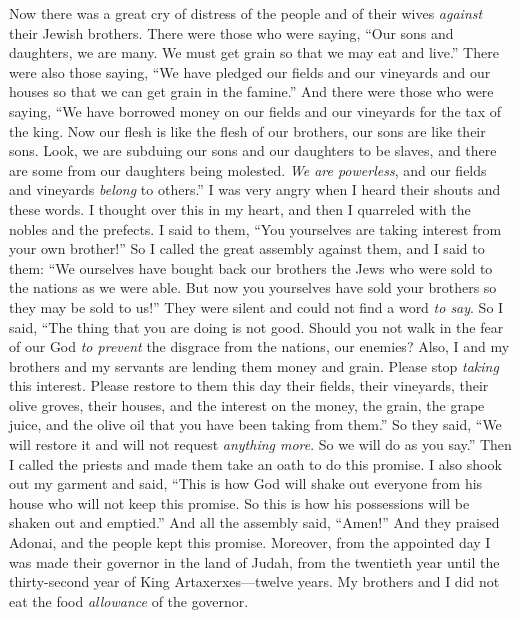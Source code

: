 \begin{biblechapter} %
 Now there was a great cry of distress of the people and of their wives \textit{against} their Jewish brothers.
\verse There were those who were saying, “Our sons and daughters, we are many. We must get grain so that we may eat and live.”
\verse There were also those saying, “We have pledged our fields and our vineyards and our houses so that we can get grain in the famine.”
\verse And there were those who were saying, “We have borrowed money on our fields and our vineyards for the tax of the king.
\verse Now our flesh is like the flesh of our brothers, our sons are like their sons. Look, we are subduing our sons and our daughters to be slaves, and there are some from our daughters being molested. \textit{We are powerless}, and our fields and vineyards \textit{belong} to others.”
\verse I was very angry when I heard their shouts and these words.
\verse I thought over this in my heart, and then I quarreled with the nobles and the prefects. I said to them, “You yourselves are taking interest from your own brother!” So I called the great assembly against them,
\verse and I said to them: “We ourselves have bought back our brothers the Jews who were sold to the nations as we were able. But now you yourselves have sold your brothers so they may be sold to us!” They were silent and could not find a word \textit{to say}.
\verse So I said, “The thing that you are doing is not good. Should you not walk in the fear of our God \textit{to prevent} the disgrace from the nations, our enemies?
\verse Also, I and my brothers and my servants are lending them money and grain. Please stop \textit{taking} this interest.
\verse Please restore to them this day their fields, their vineyards, their olive groves, their houses, and the interest on the money, the grain, the grape juice, and the olive oil that you have been taking from them.”
\verse So they said, “We will restore it and will not request \textit{anything more}. So we will do as you say.” Then I called the priests and made them take an oath to do this promise.
\verse I also shook out my garment and said, “This is how God will shake out everyone from his house who will not keep this promise. So this is how his possessions will be shaken out and emptied.” And all the assembly said, “Amen!” And they praised Adonai, and the people kept this promise.
 Moreover, from the appointed day I was made their governor in the land of Judah, from the twentieth year until the thirty-second year of King Artaxerxes—twelve years. My brothers and I did not eat the food \textit{allowance} of the governor.

\end{biblechapter}
